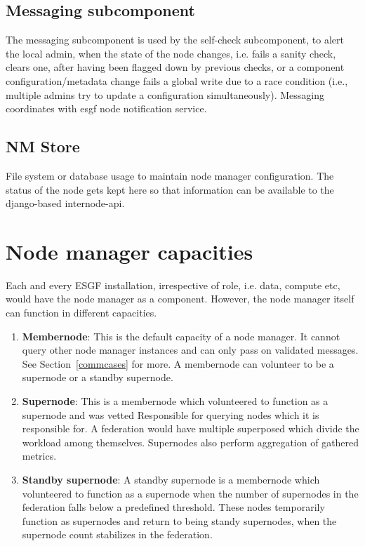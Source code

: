 \documentclass[oneside,12pt]{memoir}
\begin{document}
\subsection{Messaging subcomponent}

The messaging subcomponent is used by the self-check subcomponent, to alert the local admin, when the state of the node changes, i.e. fails a sanity check,  clears one, after having been flagged down by previous checks, or a component configuration/metadata change fails a global write due to a race condition (i.e., multiple admins try to update a configuration simultaneously).  
  Messaging coordinates with esgf node notification service.

\subsection{NM Store}

File system or database usage to maintain node manager configuration.  The status of the node gets kept here so that information can be available to the django-based internode-api.



\section{Node manager capacities}
Each and every ESGF installation, irrespective of role, i.e. data, compute etc, would have the node manager as a component.  However, the node manager itself can function in different capacities. 
\begin{enumerate}
\item \textbf{Membernode}: This is the default capacity of a node manager. It cannot query other node manager instances and can only pass on validated messages. See Section~\ref{commcases} for more. A membernode can volunteer to be a supernode or a standby supernode.
\item \textbf{Supernode}: This is a membernode which volunteered to function as a supernode and was vetted Responsible for querying nodes which it is responsible for.  A federation would have multiple superposed which divide the workload among themselves. Supernodes also perform aggregation of gathered metrics. 
\item \textbf{Standby supernode}: A standby supernode is a membernode which volunteered to function as a supernode when the number of supernodes in the federation falls below a predefined threshold. These nodes temporarily function as supernodes and return to being standy supernodes, when the supernode count stabilizes in the federation.
\end{enumerate}
\end{document}
